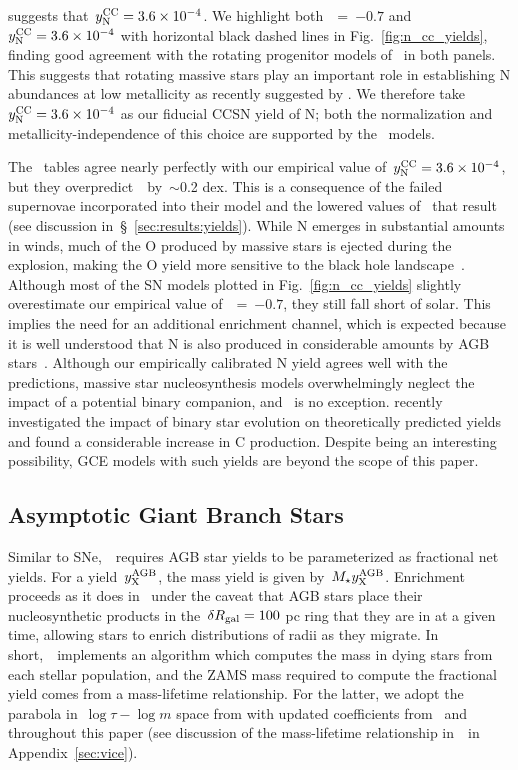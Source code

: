 \documentclass[ms.tex]{subfiles}
\begin{document}
suggests that~$y_\text{N}^\text{CC} = 3.6\times10^{-4}$.
We highlight both~\no\subcc~=~$-0.7$ and~$y_\text{N}^\text{CC} = 3.6\times10^{-4}$ with
horizontal black dashed lines in Fig.~\ref{fig:n_cc_yields}, finding good
agreement with the rotating progenitor models of~\citet{Limongi2018} in both
panels.
This suggests that rotating massive stars play an important role in
establishing N abundances at low metallicity as recently suggested by
\citet{Grisoni2021}.
We therefore take~$y_\text{N}^\text{CC} = 3.6\times10^{-4}$ as our fiducial CCSN yield of N;
both the normalization and metallicity-independence of this choice are
supported by the~\citet{Limongi2018} models.
\par
The~\citet{Sukhbold2016} tables agree nearly perfectly with our empirical value
of~$y_\text{N}^\text{CC} = 3.6\times10^{-4}$, but they overpredict~\no\subcc~by~$\sim$0.2
dex.
This is a consequence of the failed supernovae incorporated into their model
and the lowered values of~ that result (see discussion
in~\S~\ref{sec:results:yields}).
While N emerges in substantial amounts in winds, much of the O produced by
massive stars is ejected during the explosion, making the O yield more
sensitive to the black hole landscape~\citep{Griffith2021a}.
Although most of the SN models plotted in Fig.~\ref{fig:n_cc_yields} slightly
overestimate our empirical value of~\no\subcc~=~$-0.7$, they still fall short
of solar.
This implies the need for an additional enrichment channel, which is expected
because it is well understood that N is also produced in considerable amounts
by AGB stars~\citep{Johnson2019}.
Although our empirically calibrated N yield agrees well with
the~\citet{Limongi2018} predictions, massive star nucleosynthesis models
overwhelmingly neglect the impact of a potential binary companion,
and~\citet{Limongi2018} is no exception.
\citet{Farmer2021} recently investigated the impact of binary star evolution on
theoretically predicted yields and found a considerable increase in C
production.
Despite being an interesting possibility, GCE models with such yields are beyond
the scope of this paper.


\subsection{Asymptotic Giant Branch Stars}
\label{sec:yields:agb}

Similar to SNe,~\vice~requires AGB star yields to be parameterized as
fractional net yields.
For a yield~$y_\text{X}^\text{AGB}$, the mass yield is given by~$M_\star y_\text{X}^\text{AGB}$.
Enrichment proceeds as it does in~\citet{Johnson2021} under the caveat that
AGB stars place their nucleosynthetic products in the~$\delta R_\text{gal} = 100$ pc
ring that they are in at a given time, allowing stars to enrich distributions
of radii as they migrate.
In short,~\vice~implements an algorithm which computes the mass in dying stars
from each stellar population, and the ZAMS mass required to compute the
fractional yield comes from a mass-lifetime relationship. 
For the latter, we adopt the parabola in~$\log\tau - \log m$ space from
\citet{Larson1974} with updated coefficients from~\citet{Kobayashi2004} and
\citet*{David1990} throughout this paper (see discussion of the mass-lifetime
relationship in~\vice~in Appendix~\ref{sec:vice}).
\end{document}

